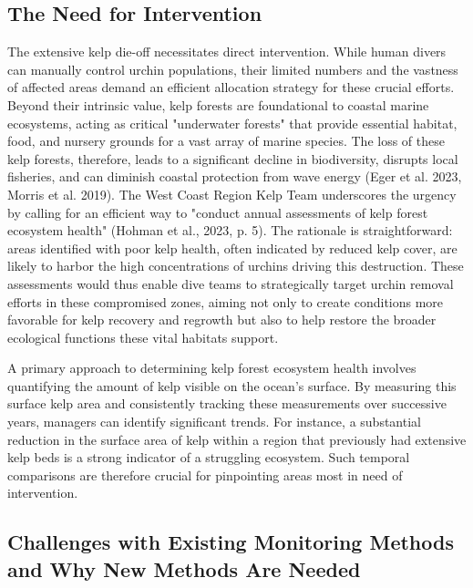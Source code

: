 \documentclass{article}
\begin{document}
\subsection{The Need for Intervention} 

The extensive kelp die-off necessitates direct intervention. While human divers can manually control urchin populations, their limited numbers and the vastness of affected areas demand an efficient allocation strategy for these crucial efforts. Beyond their intrinsic value, kelp forests are foundational to coastal marine ecosystems, acting as critical "underwater forests" that provide essential habitat, food, and nursery grounds for a vast array of marine species. The loss of these kelp forests, therefore, leads to a significant decline in biodiversity, disrupts local fisheries, and can diminish coastal protection from wave energy (Eger et al. 2023, Morris et al. 2019). The West Coast Region Kelp Team underscores the urgency by calling for an efficient way to "conduct annual assessments of kelp forest ecosystem health" (Hohman et al., 2023, p. 5). The rationale is straightforward: areas identified with poor kelp health, often indicated by reduced kelp cover, are likely to harbor the high concentrations of urchins driving this destruction. These assessments would thus enable dive teams to strategically target urchin removal efforts in these compromised zones, aiming not only to create conditions more favorable for kelp recovery and regrowth but also to help restore the broader ecological functions these vital habitats support. 

A primary approach to determining kelp forest ecosystem health involves quantifying the amount of kelp visible on the ocean's surface. By measuring this surface kelp area and consistently tracking these measurements over successive years, managers can identify significant trends. For instance, a substantial reduction in the surface area of kelp within a region that previously had extensive kelp beds is a strong indicator of a struggling ecosystem. Such temporal comparisons are therefore crucial for pinpointing areas most in need of intervention.

\subsection{Challenges with Existing Monitoring Methods and Why New Methods Are Needed} 
\end{document}
